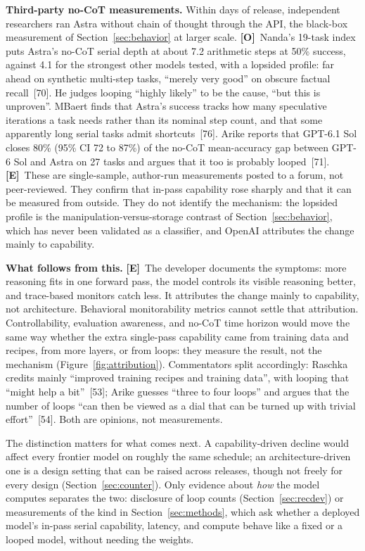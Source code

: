 \documentclass[11pt,letterpaper]{article}
\newcommand{\mO}{\textcolor{sensorteal}{\textbf{[O]}}}
\newcommand{\mE}{\textcolor{deepindigo}{\textbf{[E]}}}
\begin{document}
\textbf{Third-party no-CoT measurements.} Within days of release, independent researchers ran Astra without chain of thought through the API, the black-box measurement of Section~\ref{sec:behavior} at larger scale. \mO\ Nanda's 19-task index puts Astra's no-CoT serial depth at about 7.2 arithmetic steps at 50\% success, against 4.1 for the strongest other models tested, with a lopsided profile: far ahead on synthetic multi-step tasks, ``merely very good'' on obscure factual recall~[70]. He judges looping ``highly likely'' to be the cause, ``but this is unproven''. MBaert finds that Astra's success tracks how many speculative iterations a task needs rather than its nominal step count, and that some apparently long serial tasks admit shortcuts~[76]. Arike reports that GPT-6.1 Sol closes 80\% (95\% CI 72 to 87\%) of the no-CoT mean-accuracy gap between GPT-6 Sol and Astra on 27 tasks and argues that it too is probably looped~[71]. \mE\ These are single-sample, author-run measurements posted to a forum, not peer-reviewed. They confirm that in-pass capability rose sharply and that it can be measured from outside. They do not identify the mechanism: the lopsided profile is the manipulation-versus-storage contrast of Section~\ref{sec:behavior}, which has never been validated as a classifier, and OpenAI attributes the change mainly to capability.

\textbf{What follows from this.} \mE\ The developer documents the symptoms: more reasoning fits in one forward pass, the model controls its visible reasoning better, and trace-based monitors catch less. It attributes the change mainly to capability, not architecture. Behavioral monitorability metrics cannot settle that attribution. Controllability, evaluation awareness, and no-CoT time horizon would move the same way whether the extra single-pass capability came from training data and recipes, from more layers, or from loops: they measure the result, not the mechanism (Figure~\ref{fig:attribution}). Commentators split accordingly: Raschka credits mainly ``improved training recipes and training data'', with looping that ``might help a bit''~[53]; Arike guesses ``three to four loops'' and argues that the number of loops ``can then be viewed as a dial that can be turned up with trivial effort''~[54]. Both are opinions, not measurements.

The distinction matters for what comes next. A capability-driven decline would affect every frontier model on roughly the same schedule; an architecture-driven one is a design setting that can be raised across releases, though not freely for every design (Section~\ref{sec:counter}). Only evidence about \emph{how} the model computes separates the two: disclosure of loop counts (Section~\ref{sec:recdev}) or measurements of the kind in Section~\ref{sec:methods}, which ask whether a deployed model's in-pass serial capability, latency, and compute behave like a fixed or a looped model, without needing the weights.
\end{document}
